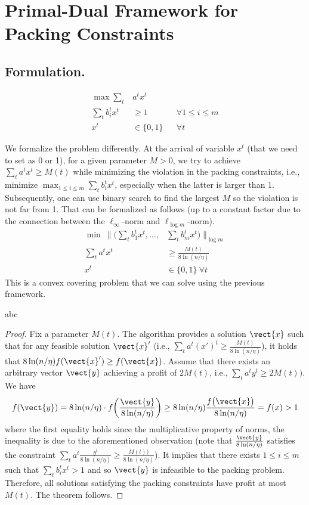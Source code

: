 
\section{Primal-Dual Framework for Packing Constraints}		\label{sec:packing}

\subsection{Formulation.}

\begin{align*}
\max  \sum_{t} &a^{t} x^{t} \\
\sum_{t} b_{i}^{t} x^{t} &\geq 1 & &  \forall 1 \leq i \leq m \\
x^{t} &\in \{0,1\} & & \forall t
\end{align*}

We formalize the problem differently. At the arrival of variable $x^{t}$ (that we need to set as 0 or 1), for a given parameter $M > 0$, we try to achieve
$\sum_{t} a^{t} x^{t} \geq M(t)$ while minimizing the violation in the packing constraints, i.e., minimize $\max_{1 \leq i \leq m} \sum_{t} b_{i}^{t} x^{t}$, especially when
the latter is larger than 1. Subsequently, one can use binary search to find the largest $M$ so the violation is not far from 1.
That can be formalized as follows (up to a constant factor due to the connection between the $\ell_{\infty}$-norm and $\ell_{\log m}$-norm).
%
\begin{align*}
\min ~ \biggl \| \biggl( \sum_{t} b_{1}^{t} x^{t}, \ldots, &\sum_{t} b_{m}^{t} x^{t} \biggr) \biggr \|_{\log m}  \\
\sum_{t} a^{t} x^{t} &\geq \frac{M(t)}{8\ln(n/\eta)}  \\
x^{t} &\in \{0,1\} ~ \forall t
\end{align*}
%
This is a convex covering problem that we can solve using the previous framework.

\begin{theorem}
abc
\end{theorem}
%
\begin{proof}
Fix a parameter $M(t)$. The algorithm provides a solution $\vect{x}$ such that for any feasible solution $\vect{x}'$
(i.e., $\sum_{t} a^{t} (x')^{t} \geq \frac{M(t)}{8\ln(n/\eta)}$), it holds that
$8\ln(n/\eta) f(\vect{x}') \geq f(\vect{x})$.
Assume that there exists an arbitrary vector $\vect{y}$
achieving a profit of $2M(t)$, i.e.,  $\sum_{t} a^{t} y^{t} \geq 2M(t))$.
We have
$$
f(\vect{y}) =  8\ln(n/\eta) \cdot f\biggl(\frac{\vect{y}}{8\ln(n/\eta)}\biggr) \geq
8\ln(n/\eta) \frac{f\bigl( \vect{x}\bigr)}{8\ln(n/\eta)} = f(x) > 1
$$
where the first equality holds since the multiplicative property of norms, the inequality is due to the aforementioned observation
(note that $\frac{\vect{y}}{8\ln(n/\eta)}$ satisfies the constraint $\sum_{t} a^{t} \frac{y^{t}}{8\ln(n/\eta)} \geq \frac{M(t))}{8\ln(n/\eta)}$).
It implies that there exists $1 \leq i \leq m$ such that $\sum_{t} b_{i}^{t} x^{t} > 1$ and so $\vect{y}$ is infeasible to the packing problem.
Therefore, all solutions satisfying the packing constraints have profit at most $M(t)$. The theorem follows.
\end{proof}


